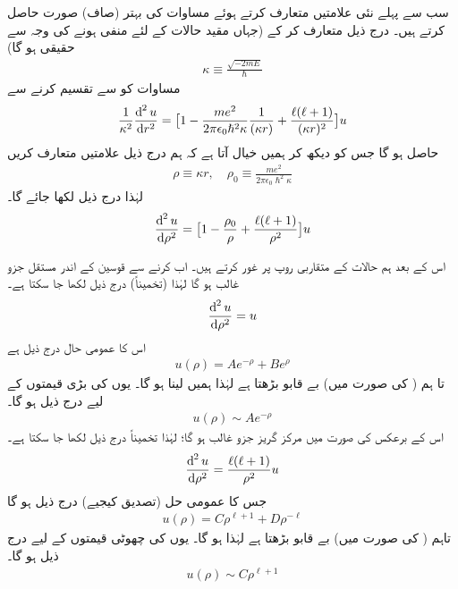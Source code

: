  سب سے پہلے نئی علامتیں متعارف کرتے ہوئے مساوات کی بہتر (صاف) صورت حاصل کرتے ہیں۔ درج ذیل متعارف کر کے (جہاں مقید حالات کے لئے  منفی ہونے کی وجہ سے  حقیقی ہو گا)
 \begin{align}\label{مساوات_ابعادی_متعارف_الف}
\kappa \equiv \frac{\sqrt{-2mE}}{\hslash} 
\end{align}
 مساوات  کو  سے تقسیم کرنے سے
\begin{align*}
\frac{1}{\kappa ^{2}}\frac{\dif^{\,2}{u}}{\dif{r^{2}}}=\big[1-\frac{me^{2}}{2\pi\epsilon_{0}\hslash^{2}\kappa }\frac{1}{(\kappa r)}+\frac{\ell(\ell+1)}{(\kappa r)^{2}}\big]u 
\end{align*}
حاصل ہو گا جس کو دیکھ کر ہمیں خیال آتا ہے کہ ہم درج ذیل علامتیں متعارف کریں 
\begin{align}\label{مساوات_ابعادی_متعارف_ب}
\rho\equiv \kappa r, \quad \rho_{0}\equiv\frac{me^{2}}{2\pi\epsilon_{0}\hslash^{2}\kappa } 
\end{align}
لہٰذا درج ذیل لکھا جائے گا۔
\begin{align}\label{مساوات_ابعادی_رداسی_کولمب_نئے_متغیرات}
\frac{\dif^{\,2}{u}}{\dif{\rho^{2}}}=\big[1-\frac{\rho_{0}}{\rho}+\frac{\ell(\ell+1)}{\rho^{2}}\big]u 
\end{align}

اس کے بعد ہم حالات کے متقاربی روپ پر غور کرتے ہیں۔ اب  کرنے سے قوسین کے اندر مستقل جزو غالب ہو گا لہٰذا (تخمیناً) درج ذیل لکھا جا سکتا ہے۔
\begin{align*}
\frac{\dif^{\,2}{u}}{\dif{\rho^{2}}}=u 
\end{align*}
اس کا عمومی حال درج ذیل ہے
\begin{align}\label{مساوات_ابعاد_عمومی_حل_بے_قابو}
u(\rho)=Ae^{-\rho}+Be^{\rho} 
\end{align}
تا ہم ( کی صورت میں)  بے قابو بڑھتا ہے لہٰذا ہمیں  لینا ہو گا۔ یوں  کی بڑی قیمتوں کے لیے درج ذیل ہو گا۔
\begin{align}
u(\rho)\sim Ae^{-\rho} 
\end{align}
اس کے برعکس  کی صورت میں مرکز گریز جزو غالب ہو گا؛ لہٰذا تخمیناً درج ذیل لکھا جا سکتا ہے۔ 
\begin{align*}
\frac{\dif^{\,2}{u}}{\dif{\rho^{2}}}=\frac{\ell(\ell+1)}{\rho^{2}}u 
\end{align*}
 جس کا عمومی حل (تصدیق کیجیے) درج ذیل ہو گا
 \begin{align*}
u(\rho)=C\rho^{\ell+1}+D\rho^{-\ell} 
\end{align*}
 تاہم ( کی صورت میں)  بے قابو بڑھتا ہے لہٰذا  ہو گا۔ یوں  کی چھوٹی قیمتوں کے لیے درج ذیل ہو گا۔
 \begin{align}\label{مساوات_ابعادی_ہائیڈروجن_مبدا_قریب}
u(\rho)\sim C\rho^{\ell+1} 
\end{align}

